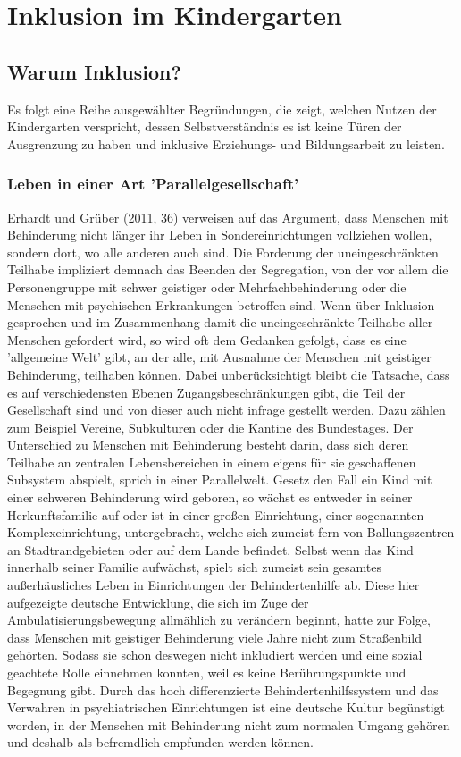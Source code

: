 \chapter{Inklusion im Kindergarten}

\section{Warum Inklusion?}
\label{sec:Why}
Es folgt eine Reihe ausgewählter Begründungen, die zeigt, welchen Nutzen der Kindergarten verspricht, dessen Selbstverständnis es ist keine Türen der Ausgrenzung zu haben und inklusive Erziehungs- und Bildungsarbeit zu leisten. 

\subsection{Leben in einer Art 'Parallelgesellschaft'}
Erhardt und Grüber (2011, 36) verweisen auf das Argument, dass Menschen mit Behinderung nicht länger ihr Leben in Sondereinrichtungen vollziehen wollen, sondern dort, wo alle anderen auch sind. Die Forderung der uneingeschränkten Teilhabe impliziert demnach das Beenden der Segregation, von der vor allem die Personengruppe mit schwer geistiger oder Mehrfachbehinderung oder die Menschen mit psychischen Erkrankungen betroffen sind. Wenn über Inklusion gesprochen und im Zusammenhang damit die uneingeschränkte Teilhabe aller Menschen gefordert wird, so wird oft dem Gedanken gefolgt, dass es eine 'allgemeine Welt' gibt, an der alle, mit Ausnahme der Menschen mit geistiger Behinderung, teilhaben können. Dabei unberücksichtigt bleibt die Tatsache, dass es auf verschiedensten Ebenen Zugangsbeschränkungen gibt, die Teil der Gesellschaft sind und von dieser auch nicht infrage gestellt werden. Dazu zählen zum Beispiel Vereine, Subkulturen oder die Kantine des Bundestages. Der Unterschied zu Menschen mit Behinderung besteht darin, dass sich deren Teilhabe an zentralen Lebensbereichen in einem eigens für sie geschaffenen Subsystem abspielt, sprich in einer Parallelwelt.
Gesetz den Fall ein Kind mit einer schweren Behinderung wird geboren, so wächst es entweder in seiner Herkunftsfamilie auf oder ist in einer großen Einrichtung, einer sogenannten Komplexeinrichtung, untergebracht, welche sich zumeist fern von Ballungszentren an Stadtrandgebieten oder auf dem Lande befindet. Selbst wenn das Kind  innerhalb seiner Familie aufwächst, spielt sich zumeist sein gesamtes außerhäusliches Leben in Einrichtungen der Behindertenhilfe ab. Diese hier aufgezeigte deutsche Entwicklung, die sich im Zuge der Ambulatisierungsbewegung allmählich zu verändern beginnt, hatte zur Folge, dass Menschen mit geistiger Behinderung viele Jahre nicht zum Straßenbild gehörten. Sodass sie schon deswegen nicht inkludiert werden und eine sozial geachtete Rolle einnehmen konnten, weil es keine Berührungspunkte und Begegnung gibt. Durch das hoch differenzierte Behindertenhilfssystem und das Verwahren in psychiatrischen Einrichtungen ist eine deutsche Kultur begünstigt worden, in der Menschen mit Behinderung nicht zum normalen Umgang gehören und deshalb als befremdlich empfunden werden können.
